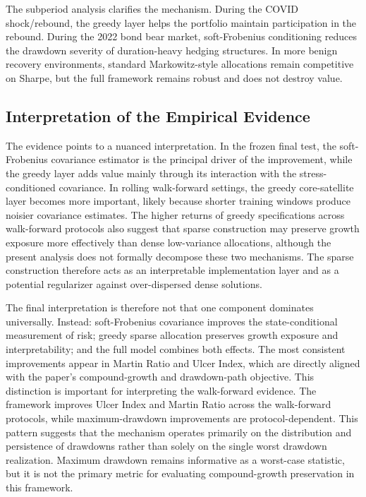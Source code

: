 \documentclass[11pt]{article}
\begin{document}
The subperiod analysis clarifies the mechanism. During the COVID shock/rebound, the greedy layer helps the portfolio maintain participation in the rebound. During the 2022 bond bear market, soft-Frobenius conditioning reduces the drawdown severity of duration-heavy hedging structures. In more benign recovery environments, standard Markowitz-style allocations remain competitive on Sharpe, but the full framework remains robust and does not destroy value.

\subsection{Interpretation of the Empirical Evidence}

The evidence points to a nuanced interpretation. In the frozen final test, the soft-Frobenius covariance estimator is the principal driver of the improvement, while the greedy layer adds value mainly through its interaction with the stress-conditioned covariance. In rolling walk-forward settings, the greedy core-satellite layer becomes more important, likely because shorter training windows produce noisier covariance estimates. The higher returns of greedy specifications across walk-forward protocols also suggest that sparse construction may preserve growth exposure more effectively than dense low-variance allocations, although the present analysis does not formally decompose these two mechanisms. The sparse construction therefore acts as an interpretable implementation layer and as a potential regularizer against over-dispersed dense solutions.

The final interpretation is therefore not that one component dominates universally. Instead: soft-Frobenius covariance improves the state-conditional measurement of risk; greedy sparse allocation preserves growth exposure and interpretability; and the full model combines both effects. The most consistent improvements appear in Martin Ratio and Ulcer Index, which are directly aligned with the paper's compound-growth and drawdown-path objective. This distinction is important for interpreting the walk-forward evidence. The framework improves Ulcer Index and Martin Ratio across the walk-forward protocols, while maximum-drawdown improvements are protocol-dependent. This pattern suggests that the mechanism operates primarily on the distribution and persistence of drawdowns rather than solely on the single worst drawdown realization. Maximum drawdown remains informative as a worst-case statistic, but it is not the primary metric for evaluating compound-growth preservation in this framework.
\end{document}
